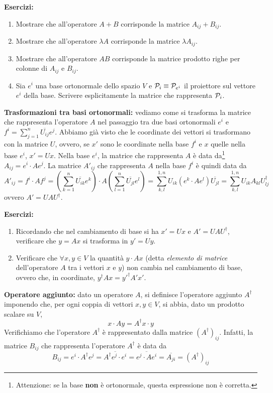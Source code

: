 \documentclass[a4paper,10pt]{article}
\newcommand{\linea}{\vskip14pt \noindent}
\begin{document}
\linea
{\bf Esercizi:}
\begin{enumerate}
\item Mostrare che all'operatore $A+B$ corrisponde la matrice $A_{ij}+B_{ij}$.
\item Mostrare che all'operatore $\lambda A$ corrisponde la matrice $\lambda A_{ij}$.
\item Mostrare che all'operatore $AB$ corrisponde la matrice prodotto righe per colonne di $A_{ij}$ e $B_{ij}$.
\item Sia $e^i$ una base ortonormale dello spazio $V$ e ${\cal P}_i \equiv {\cal P}_{e^i}$ 
il proiettore sul vettore $e^i$ della base.
Scrivere esplicitamente la matrice che rappresenta ${\cal P}_i$.
\end{enumerate}

\linea
{\bf Trasformazioni tra basi ortonormali:}
vediamo come si trasforma la matrice che rappresenta l'operatore $A$ nel passaggio tra due basi
ortonormali $e^i$ e $f^i = \sum_{j=1}^n \overline{U_{ij}} e^j$. 
Abbiamo gi\`a visto che le coordinate dei vettori si trasformano con la matrice $U$, ovvero, se 
$x'$ sono le coordinate nella base $f^i$ e $x$ quelle nella base $e^i$, $x'=Ux$.
Nella base $e^i$, la matrice che rappresenta $A$ \`e data
da\footnote{Attenzione: se la base {\bf non} \`e ortonormale, questa espressione
non \`e corretta.} $A_{ij}=e^i \cdot Ae^j$.
La matrice $A'_{ij}$ che rappresenta $A$ nella base $f^i$ \`e quindi data da
\begin{equation}
A'_{ij}=f^i \cdot A f^j = 
\left( \sum_{k=1}^n \overline{U_{ik}} e^k \right) \cdot A \left( \sum_{l=1}^n \overline{U_{jl}} e^l \right)
= \sum_{k,l}^{1,n} U_{ik} (e^k \cdot A e^l) \overline{U_{jl}} 
= \sum_{k,l}^{1,n} U_{ik} A_{kl} U^\dag_{lj}
\end{equation}
ovvero $A'=UAU^\dag$.

\linea
{\bf Esercizi:}
\begin{enumerate}
\item Ricordando che nel cambiamento di base si ha $x'=Ux$ e $A'=UAU^\dag$, verificare che $y = Ax$ si
trasforma in $y'=Uy$.
\item Verificare che $\forall x,y \in V$ la quantit\`a $y \cdot Ax$ (detta {\it elemento di matrice}
dell'operatore $A$ tra i vettori $x$ e $y$) non cambia nel cambiamento di base, ovvero che, in
coordinate, $y^\dag A x={y'}^\dag A' x'$.
\end{enumerate}

\newpage

\linea
{\bf Operatore aggiunto:} dato un operatore $A$, si definisce l'operatore aggiunto $A^\dag$ imponendo
che, per ogni coppia di vettori $x,y \in V$, si abbia, dato un prodotto scalare su $V$,
\begin{equation}
x \cdot Ay = A^\dag x \cdot y
\end{equation}
Verifichiamo che l'operatore $A^\dag$ \`e rappresentato dalla matrice $(A^\dag)_{ij}$. Infatti, la matrice
$B_{ij}$ che rappresenta l'operatore $A^\dag$ \`e data da
\begin{equation}
B_{ij} = e^i \cdot A^\dag e^j = \overline{A^\dag e^j \cdot e^i} = \overline{e^j \cdot A e^i} = 
\overline{A_{ji}} = (A^\dag)_{ij}
\end{equation}
\end{document}
